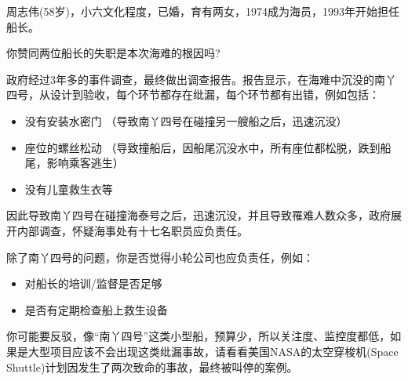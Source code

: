 周志伟(58岁)，小六文化程度，已婚，育有两女，1974成为海员，1993年开始担任船长。



你赞同两位船长的失职是本次海难的根因吗?

政府经过3年多的事件调查，最终做出调查报告。报告显示，在海难中沉没的南丫四号，从设计到验收，每个环节都存在纰漏，每个环节都有出错，例如包括：

\begin{itemize}
\tightlist
\item
  没有安装水密门 （导致南丫四号在碰撞另一艘船之后，迅速沉没）
\item
  座位的螺丝松动
  （导致撞船后，因船尾沉没水中，所有座位都松脱，跌到船尾，影响乘客逃生）
\item
  没有儿童救生衣等
\end{itemize}

因此导致南丫四号在碰撞海泰号之后，迅速沉没，并且导致罹难人数众多，政府展开内部调查，怀疑海事处有十七名职员应负责任。

除了南丫四号的问题，你是否觉得小轮公司也应负责任，例如：

\begin{itemize}
\tightlist
\item
  对船长的培训/监督是否足够
\item
  是否有定期检查船上救生设备
\end{itemize}

你可能要反驳，像``南丫四号''这类小型船，预算少，所以关注度、监控度都低，如果是大型项目应该不会出现这类纰漏事故，请看看美国NASA的太空穿梭机(Space
Shuttle)计划因发生了两次致命的事故，最终被叫停的案例。

